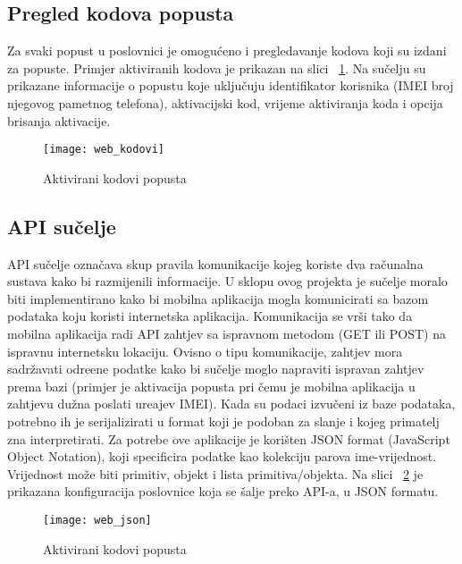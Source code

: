 \subsection{Pregled kodova popusta}
Za svaki popust u poslovnici je omogu\'{c}eno i pregledavanje kodova koji su izdani za popuste. Primjer aktiviranih kodova je prikazan na slici ~\ref{fig:web_kodovi}. Na su\v{c}elju su prikazane informacije o popustu koje uklju\v{c}uju identifikator korisnika (IMEI broj njegovog pametnog telefona), aktivacijski kod, vrijeme aktiviranja koda i opcija brisanja aktivacije.

\begin{figure}[!htbp]
	\begin{center}
 \texttt{[image: web\_kodovi]}
 \caption{Aktivirani kodovi popusta}
 \label{fig:web_kodovi}
	\end{center}
\end{figure}

\subsection{API su\v{c}elje}

API su\v{c}elje ozna\v{c}ava skup pravila komunikacije kojeg koriste dva ra\v{c}unalna sustava kako bi razmijenili informacije. U sklopu ovog projekta je su\v{c}elje moralo biti implementirano kako bi mobilna aplikacija mogla komunicirati sa bazom podataka koju koristi internetska aplikacija. Komunikacija se vr\v{s}i tako da mobilna aplikacija radi API zahtjev sa ispravnom metodom (GET ili POST) na ispravnu internetsku lokaciju. Ovisno o tipu komunikacije, zahtjev mora sadr\v{z}avati odre\dj ene podatke kako bi su\v{c}elje moglo napraviti ispravan zahtjev prema bazi (primjer je aktivacija popusta pri \v{c}emu je mobilna aplikacija u zahtjevu du\v{z}na poslati ure\dj ajev IMEI). Kada su podaci izvu\v{c}eni iz baze podataka, potrebno ih je serijalizirati u format koji je podoban za slanje i kojeg primatelj zna interpretirati. Za potrebe ove aplikacije je kori\v{s}ten JSON format \cite{json} (JavaScript Object Notation), koji specificira podatke kao kolekciju parova ime-vrijednost. Vrijednost mo\v{z}e biti primitiv, objekt i lista primitiva/objekta. Na slici ~\ref{fig:web_json} je prikazana konfiguracija poslovnice koja se \v{s}alje preko API-a, u JSON formatu.


\begin{figure}[!htbp]
	\begin{center}
 \texttt{[image: web\_json]}
 \caption{Aktivirani kodovi popusta}
 \label{fig:web_json}
	\end{center}
\end{figure}


